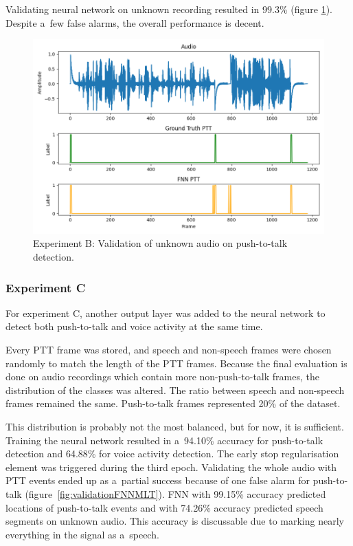     Validating neural network on unknown recording resulted in 99.3\% (figure \ref{fig:validationFNN12}). Despite a~few false alarms, the overall performance is decent.

    \begin{figure}[ht!]
        \centering
        \includegraphics[width = \textwidth]{obrazky-figures/FNNOUTPUT_12.png}
        \caption{Experiment B: Validation of unknown audio on push-to-talk detection.}
        \label{fig:validationFNN12}
    \end{figure}

    \newpage
    
    \subsubsection{Experiment C}\label{expC}
    
    For experiment C, another output layer was added to the neural network to detect both push-to-talk and voice activity at the same time. 

    Every PTT frame was stored, and speech and non-speech frames were chosen randomly to match the length of the PTT frames. Because the final evaluation is done on audio recordings which contain more non-push-to-talk frames, the distribution of the classes was altered. The ratio between speech and non-speech frames remained the same. Push-to-talk frames represented 20\% of the dataset. 
    
    This distribution is probably not the most balanced, but for now, it is sufficient.
    Training the neural network resulted in a~94.10\% accuracy for push-to-talk detection and 64.88\% for voice activity detection. The early stop regularisation element was triggered during the third epoch. Validating the whole audio with PTT events ended up as a~partial success because of one false alarm for push-to-talk (figure~\ref{fig:validationFNNMLT}). FNN with 99.15\% accuracy predicted locations of push-to-talk events and with 74.26\% accuracy predicted speech segments on unknown audio. This accuracy is discussable due to marking nearly everything in the signal as a~speech. 
    
